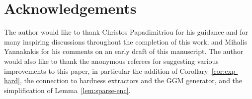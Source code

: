 \documentclass[11pt]{article}
\def\cl{\bf}
\begin{document}

\section{Acknowledgements}
The author would like to thank Christos Papadimitriou for his guidance and for many inspiring discussions throughout the completion of this work, and Mihalis Yannakakis for his comments on an early draft of this manuscript. The author would also like to thank the anonymous referees for suggesting various improvements to this paper, in particular the addition of Corollary~\ref{cor:exp-hard}, the connection to hardness extractors and the GGM generator, and the simplification of Lemma~\ref{lem:sparse-enc}.


\end{document}
